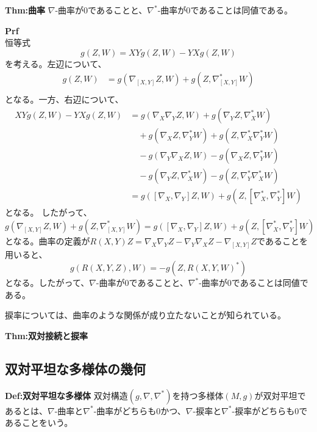 \documentclass[a4paper,11pt]{jsarticle}
\numberwithin{equation}{section}
\begin{document}
\begin{itembox}[l]{\textbf{Thm:曲率}}
    $\nabla$-曲率が0であることと、$\nabla^*$-曲率が0であることは同値である。

\end{itembox}
\textbf{Prf}\\
恒等式
\begin{equation}
    [X,Y]g(Z,W) = XYg(Z,W) - YXg(Z,W) 
\end{equation}
を考える。左辺について、
\begin{align}
    [X,Y]g(Z,W) &= g(\nabla_{[X,Y]}Z,W) + g(Z,\nabla^*_{[X,Y]}W) \\
\end{align}
となる。一方、右辺について、
\begin{align}
    XYg(Z,W) - YXg(Z,W) &= g(\nabla_X \nabla_Y Z,W) + g(\nabla_Y Z,\nabla_X^* W) \\
    &\quad+ g(\nabla_X Z,\nabla_Y^* W) + g(Z,\nabla^*_X \nabla_Y^* W) \\
    &\quad - g(\nabla_Y \nabla_X Z,W) - g(\nabla_X Z,\nabla_Y^* W) \\
    &\quad- g(\nabla_Y Z,\nabla_X^* W) - g(Z,\nabla^*_Y \nabla_X^* W) \\
    &= g([\nabla_X,\nabla_Y]Z,W) + g(Z,[\nabla_X^*,\nabla_Y^*]W)
\end{align}
となる。%
したがって、
\begin{equation}
    g(\nabla_{[X,Y]}Z,W) + g(Z,\nabla^*_{[X,Y]}W) = g([\nabla_X,\nabla_Y]Z,W) + g(Z,[\nabla_X^*,\nabla_Y^*]W)
\end{equation}
となる。曲率の定義が$R(X,Y)Z = \nabla_X \nabla_Y Z - \nabla_Y \nabla_X Z - \nabla_{[X,Y]}Z$であることを用いると、
\begin{equation}
    g(R(X,Y,Z),W) = -g(Z,R(X,Y,W)^*)
\end{equation}
となる。したがって、$\nabla$-曲率が0であることと、$\nabla^*$-曲率が0であることは同値である。\hfill\qedsymbol

捩率については、曲率のような関係が成り立たないことが知られている。
\begin{itembox}[l]{\textbf{Thm:双対接続と捩率}}
\end{itembox}

\subsection{双対平坦な多様体の幾何}
\begin{itembox}[l]{\textbf{Def:双対平坦な多様体}}
    双対構造$(g,\nabla,\nabla^*)$を持つ多様体$(M,g)$が双対平坦であるとは、$\nabla$-曲率と$\nabla^*$-曲率がどちらも0かつ、$\nabla$-捩率と$\nabla^*$-捩率がどちらも0であることをいう。

\end{itembox}
\end{document}
